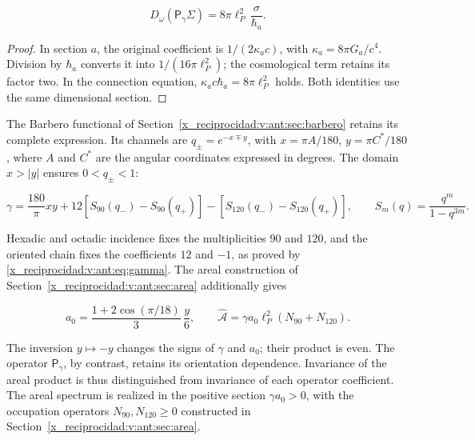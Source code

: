 \begin{equation}
D_\omega(\mathsf P_\gamma\Sigma)
=8\pi\ell_P^2\,\frac{\sigma}{\hbar_a}.
\label{x_reciprocidad:nuc12:eq:4.3}
\end{equation}



\begin{proof}
In section \(a\), the original coefficient is \(1/(2\kappa_a c)\), with \(\kappa_a=8\pi G_a/c^4\). Division by \(\hbar_a\) converts it into \(1/(16\pi\ell_P^2)\); the cosmological term retains its factor two. In the connection equation, \(\kappa_a c\hbar_a=8\pi\ell_P^2\) holds. Both identities use the same dimensional section.
\end{proof}

The Barbero functional of Section~\ref{x_reciprocidad:v:ant:sec:barbero} retains its complete expression. Its channels are \(q_\pm=e^{-x\mp y}\), with \(x=\pi A/180\), \(y=\pi C^*/180\), where \(A\) and \(C^*\) are the angular coordinates expressed in degrees. The domain \(x>|y|\) ensures \(0<q_\pm<1\):



\begin{equation}
\gamma=\frac{180}{\pi}xy+
12[S_{90}(q_-)-S_{90}(q_+)]
-[S_{120}(q_-)-S_{120}(q_+)],\qquad
S_m(q)=\frac{q^m}{1-q^{3m}}.
\label{x_reciprocidad:nuc12:eq:4.4}
\end{equation}



Hexadic and octadic incidence fixes the multiplicities \(90\) and \(120\), and the oriented chain fixes the coefficients \(12\) and \(-1\), as proved by \eqref{x_reciprocidad:v:ant:eq:gamma}. The areal construction of Section~\ref{x_reciprocidad:v:ant:sec:area} additionally gives



\begin{equation}
a_0=\frac{1+2\cos(\pi/18)}3\,\frac y6,\qquad
\widehat{\mathcal A}=\gamma a_0\ell_P^2(N_{90}+N_{120}).
\label{x_reciprocidad:nuc12:eq:4.5}
\end{equation}



The inversion \(y\mapsto-y\) changes the signs of \(\gamma\) and \(a_0\); their product is even. The operator \(\mathsf P_\gamma\), by contrast, retains its orientation dependence. Invariance of the areal product is thus distinguished from invariance of each operator coefficient. The areal spectrum is realized in the positive section \(\gamma a_0>0\), with the occupation operators \(N_{90},N_{120}\geq0\) constructed in Section~\ref{x_reciprocidad:v:ant:sec:area}.


